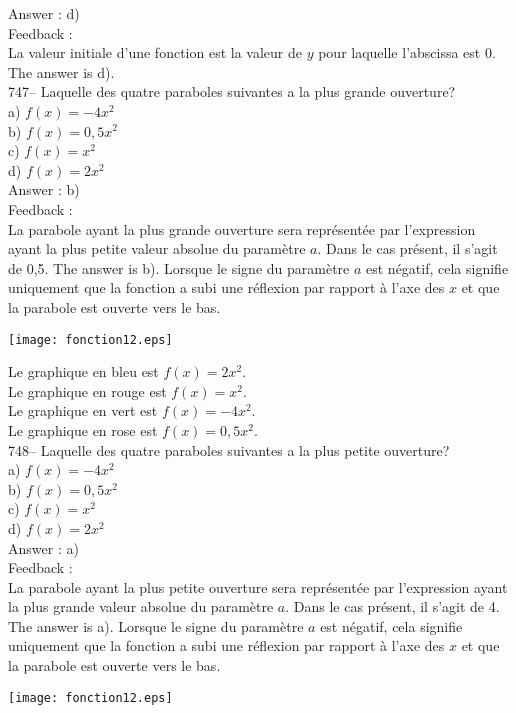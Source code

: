 \documentclass[letterpaper, 12pt]{article}
\begin{document}
Answer : d)\\

Feedback : \\
La valeur initiale d'une fonction est la valeur de $y$ pour laquelle
l'abscissa est 0.  The answer is d).\\

747-- Laquelle des quatre paraboles suivantes a la plus grande ouverture?\\
a) $f(x)=-4x^{2}$\\
b) $f(x)=0,5x^{2}$\\
c) $f(x)=x^{2}$\\
d) $f(x)=2x^{2}$\\

Answer : b)\\

Feedback : \\
La parabole ayant la plus grande ouverture sera repr\'esent\'ee par
l'expression ayant la plus petite valeur absolue du param\`etre $a$. Dans le
cas pr\'esent, il s'agit de 0,5. The answer is b). Lorsque le signe
du param\`etre $a$ est n\'egatif, cela signifie uniquement que la fonction a
subi une r\'eflexion par rapport \`a l'axe des $x$ et que la parabole est
ouverte vers le bas.\\
    \begin{center}
    \texttt{[image: fonction12.eps]}
    \end{center}
Le graphique en bleu est $f(x)=2x^{2}$.\\
Le graphique en rouge est $f(x)=x^{2}$.\\
Le graphique en vert est $f(x)=-4x^{2}$.\\
Le graphique en rose est $f(x)=0,5x^{2}$.\\


748-- Laquelle des quatre paraboles suivantes a la plus petite ouverture?\\
a) $f(x)=-4x^{2}$\\
b) $f(x)=0,5x^{2}$\\
c) $f(x)=x^{2}$\\
d) $f(x)=2x^{2}$\\

Answer : a)\\

Feedback : \\
La parabole ayant la plus petite ouverture sera repr\'esent\'ee par
l'expression ayant la plus grande valeur absolue du param\`etre $a$. Dans le
cas pr\'esent, il s'agit de 4. The answer is a). Lorsque le signe du
param\`etre $a$ est n\'egatif, cela signifie uniquement que la fonction a
subi une r\'eflexion par rapport \`a l'axe des $x$ et que la parabole est
ouverte vers le bas.\\
    \begin{center}
    \texttt{[image: fonction12.eps]}
    \end{center}
\end{document}
